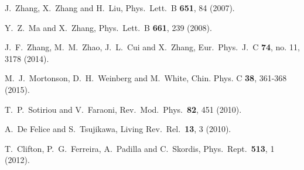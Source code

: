 \documentclass[aps,prd,nofootinbib,amsmath,amssymb,twocolumn,superscriptaddress,10pt]{revtex4}%
\begin{document}
\begin{thebibliography}{}
  J.~Zhang, X.~Zhang and H.~Liu,
  Phys.\ Lett.\ B {\bf 651}, 84 (2007).


  Y.~Z.~Ma and X.~Zhang,
  Phys.\ Lett.\ B {\bf 661}, 239 (2008).


  J.~F.~Zhang, M.~M.~Zhao, J.~L.~Cui and X.~Zhang,
  Eur.\ Phys.\ J.\ C {\bf 74}, no. 11, 3178 (2014).





  M.~J.~Mortonson, D.~H.~Weinberg and M.~White,
  Chin. Phys. C {\bf 38}, 361-368 (2015).

  T.~P.~Sotiriou and V.~Faraoni,
  Rev.\ Mod.\ Phys.\  {\bf 82}, 451 (2010).

  A.~De Felice and S.~Tsujikawa,
  Living Rev.\ Rel.\  {\bf 13}, 3 (2010).

  T.~Clifton, P.~G.~Ferreira, A.~Padilla and C.~Skordis,
  Phys.\ Rept.\  {\bf 513}, 1 (2012).


\end{thebibliography}
\end{document}
